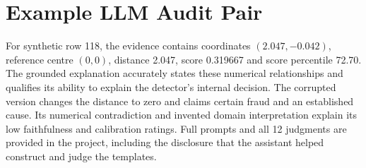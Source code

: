 \documentclass[11pt]{article}
\begin{document}
\section{Example LLM Audit Pair}
For synthetic row 118, the evidence contains coordinates $(2.047,-0.042)$, reference centre $(0,0)$, distance 2.047, score 0.319667 and score percentile 72.70. The grounded explanation accurately states these numerical relationships and qualifies its ability to explain the detector's internal decision. The corrupted version changes the distance to zero and claims certain fraud and an established cause. Its numerical contradiction and invented domain interpretation explain its low faithfulness and calibration ratings. Full prompts and all 12 judgments are provided in the project, including the disclosure that the assistant helped construct and judge the templates.
\end{document}
